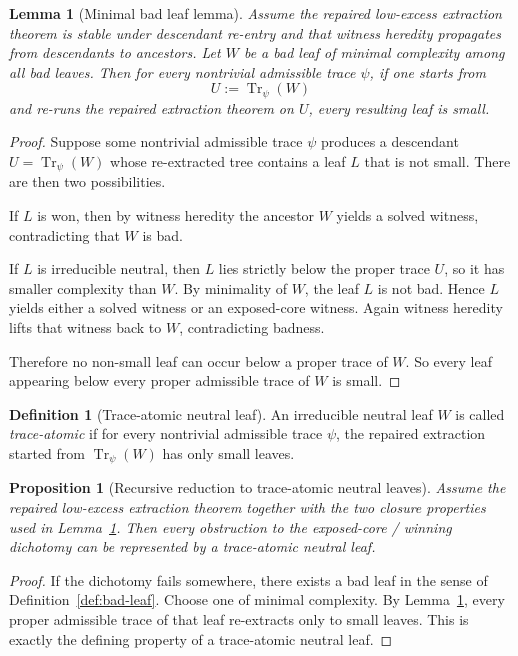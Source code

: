 \documentclass[11pt]{article}
\newtheorem{lemma}[theorem]{Lemma}
\newtheorem{proposition}[theorem]{Proposition}
\theoremstyle{definition}
\newtheorem{definition}[theorem]{Definition}
\newcommand{\1}{\mathbf{1}}
\begin{document}
\begin{lemma}[Minimal bad leaf lemma]\label{lem:minimal-bad-leaf}
Assume the repaired low-excess extraction theorem is stable under descendant re-entry and that witness heredity propagates from descendants to ancestors.
Let $W$ be a bad leaf of minimal complexity among all bad leaves.
Then for every nontrivial admissible trace $\psi$, if one starts from
\[
U:=\operatorname{Tr}_\psi(W)
\]
and re-runs the repaired extraction theorem on $U$, every resulting leaf is small.
\end{lemma}

\begin{proof}
Suppose some nontrivial admissible trace $\psi$ produces a descendant $U=\operatorname{Tr}_\psi(W)$ whose re-extracted tree contains a leaf $L$ that is not small.
There are then two possibilities.

If $L$ is won, then by witness heredity the ancestor $W$ yields a solved witness, contradicting that $W$ is bad.

If $L$ is irreducible neutral, then $L$ lies strictly below the proper trace $U$, so it has smaller complexity than $W$.
By minimality of $W$, the leaf $L$ is not bad.
Hence $L$ yields either a solved witness or an exposed-core witness.
Again witness heredity lifts that witness back to $W$, contradicting badness.

Therefore no non-small leaf can occur below a proper trace of $W$.
So every leaf appearing below every proper admissible trace of $W$ is small.
\end{proof}

\begin{definition}[Trace-atomic neutral leaf]\label{def:trace-atomic-leaf}
An irreducible neutral leaf $W$ is called \emph{trace-atomic} if for every nontrivial admissible trace $\psi$, the repaired extraction started from $\operatorname{Tr}_\psi(W)$ has only small leaves.
\end{definition}

\begin{proposition}[Recursive reduction to trace-atomic neutral leaves]\label{prop:trace-atomic-reduction}
Assume the repaired low-excess extraction theorem together with the two closure properties used in Lemma~\ref{lem:minimal-bad-leaf}.
Then every obstruction to the exposed-core / winning dichotomy can be represented by a trace-atomic neutral leaf.
\end{proposition}

\begin{proof}
If the dichotomy fails somewhere, there exists a bad leaf in the sense of Definition~\ref{def:bad-leaf}.
Choose one of minimal complexity.
By Lemma~\ref{lem:minimal-bad-leaf}, every proper admissible trace of that leaf re-extracts only to small leaves.
This is exactly the defining property of a trace-atomic neutral leaf.
\end{proof}
\end{document}
